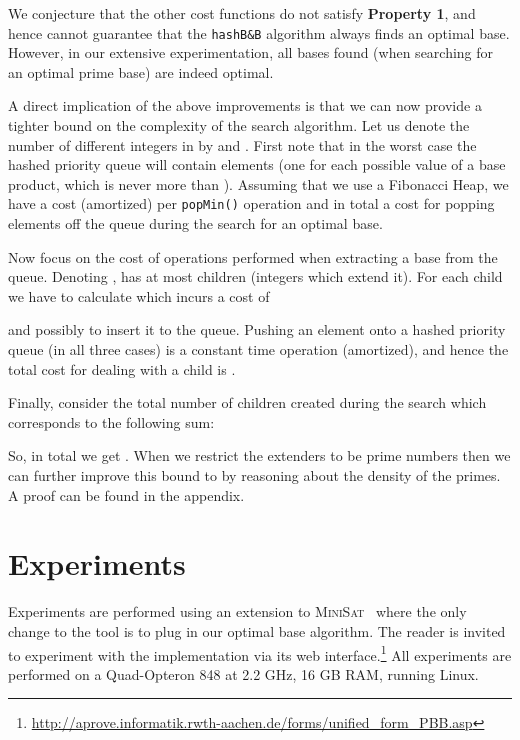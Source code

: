 \documentclass[envcountsame]{llncs}
\newcommand\minisatp{\textsc{MiniSat}}
\begin{document}
We conjecture that the other cost functions do not satisfy
\textbf{Property 1}, and hence cannot guarantee that the
\texttt{hashB\&B} algorithm always finds an optimal base.
However, in our extensive experimentation, all bases found
(when searching for an optimal prime base) are indeed optimal.





A direct implication of the above improvements is that we can now
provide a tighter bound on the complexity of the search algorithm.
Let us denote the number of different integers in  by  and
.
First note that in the worst case the hashed priority queue will
contain  elements (one for each possible value of a base product,
which is never more than ).  
Assuming that we use a Fibonacci Heap, we have a  cost
(amortized) per \texttt{popMin()} operation and in total a  cost for popping elements off the queue during the search
for an optimal base.

Now focus on the cost of operations performed when extracting a
base  from the queue. Denoting
,
 has at most 
children (integers which extend it). 
For each child we have to calculate  which incurs a cost of
 
and possibly to insert it to the queue.
Pushing an element onto a hashed priority queue (in all three cases)
is a constant time operation (amortized), and hence the total cost for
dealing with a child is .

Finally, consider the total number of children created during
the search which corresponds to the following sum:
\vspace{-2mm}
 
So, in total we get . 
When we restrict the extenders to be prime numbers then we can further
improve this bound to  by reasoning about the
density of the primes. 
A proof can be found in the appendix.
\section{Experiments}
\label{sec:exp}


Experiments are performed using an extension to \minisatp\
\cite{EenS06} where the only change to the tool is to plug in our
optimal base algorithm.
The reader is invited to experiment with the implementation via its
web interface.\footnote{
  \url{http://aprove.informatik.rwth-aachen.de/forms/unified_form_PBB.asp}}
All experiments are performed on a Quad-Opteron 848 at 2.2 GHz, 16 GB
RAM, running Linux.
\end{document}
